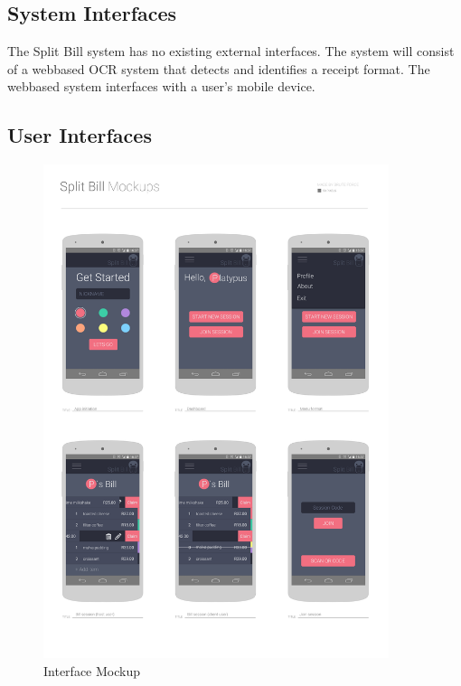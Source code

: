 \documentclass[12pt,a4paper]{article}
\begin{document}
   	\subsection{System Interfaces}

		The Split Bill system has no existing external interfaces. The system will consist of a webbased OCR system that detects and identifies a receipt format. The webbased system interfaces with a user's mobile device.
   	\subsection{User Interfaces}
   		\begin{figure}[H]
		  \includegraphics[width=0.9\textwidth]{diagrams/mockups.png}
		   \vspace{0.1cm}
		    \caption{Interface Mockup}
		    \label{Interface Mockup}
		\end{figure}
\end{document}
